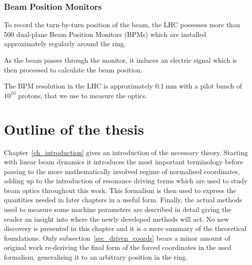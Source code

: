 
\subsubsection{Beam Position Monitors}

To record the turn-by-turn position of the beam, the LHC possesses more than 500 dual-plane
Beam Position Monitors (BPMs) \cite{koutchouk} which are installed approximately regularly around the ring. 

As the beam passes through the monitor, it induces an electric signal which is then processed
to calculate the beam position.

The BPM resolution in the LHC is approximately $\SI{0.1}{\milli\metre}$ \cite{fcc-bpm,wp2-bpm} with a pilot bunch of
$10^{10}$ protons, that we use to measure the optics.


\section{Outline of the thesis}

Chapter~\ref{ch_introduction} gives an introduction of the necessary theory. Starting with linear beam 
dynamics it introduces the most important terminology before passing to the more mathematically involved
regime of normalised coordinates, adding up to the introduction of resonance driving terms which are used
to study beam optics throughout this work.
This formalism is then used to express the quantities needed in later chapters in a useful form. 
Finally, the actual methods used to measure some machine parameters are described in detail giving the
reader an insight into where the newly developed methods will act.
No new discovery is presented in this chapter and it is a mere summary of the theoretical foundations.
Only subsection~\ref{sec_driven_coords} bears a minor amount of original work re-deriving the final form
of the forced coordinates in the used formalism, generalising it to an arbitrary position in the ring.

